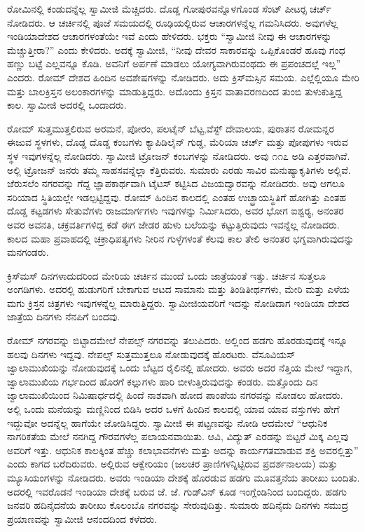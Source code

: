 \vskip 3pt

 ರೋಮಿನಲ್ಲಿ ಕಂಡುದನ್ನೆಲ್ಲ ಸ್ವಾಮೀಜಿ ಮೆಚ್ಚಿದರು. ದೊಡ್ಡ ಗೋಪುರವನ್ನೊಳಗೊಂಡ ಸೆಂಟ್ ಪೀಟರ‍್ಸ ಚರ್ಚ್ ನೋಡಿದರು. ಆ ಚರ್ಚಿನಲ್ಲಿ ಪೂಜೆ ಸಮಯದಲ್ಲಿ ರೂಢಿಯಲ್ಲಿರುವ ಆಚಾರಗಳನ್ನೆಲ್ಲ ಗಮನಿಸಿದರು. ಅವುಗಳೆಲ್ಲ ಇಂಡಿಯಾದೇಶದ ಆಚಾರಗಳಂತೆಯೇ ಇವೆ ಎಂದು ಹೇಳಿದರು. ಭಕ್ತರು “ಸ್ವಾಮೀಜಿ ನೀವು ಈ ಆಚಾರಗಳನ್ನು ಮೆಚ್ಚುತ್ತೀರಾ?” ಎಂದು ಕೇಳಿದರು. ಅದಕ್ಕೆ ಸ್ವಾಮೀಜಿ, “ನೀವು ದೇವರ ಸಾಕಾರವನ್ನು ಒಪ್ಪಿಕೊಂಡರೆ ಹೂವು ಗಂಧ ಹಣ್ಣು ಬಟ್ಟೆ ಎಲ್ಲವನ್ನೂ ಕೊಡಿ. ಅವನಿಗೆ ಅರ್ಪಣೆ ಮಾಡಲು ಯೋಗ್ಯವಾಗಿರುವಂಥದು ಈ ಪ್ರಪಂಚದಲ್ಲೆ ಇಲ್ಲ” ಎಂದರು. ರೋಮ್ ದೇಶದ ಹಿಂದಿನ ಅವಶೇಷಗಳನ್ನು ನೋಡಿದರು. ಅದು ಕ್ರಿಸ್‍ಮಸ್ಸಿನ ಸಮಯ. ಎಲ್ಲೆಲ್ಲಿಯೂ ಮೇರಿ ಮತ್ತು ಬಾಲಕ್ರಿಸ್ತನ ಅಲಂಕಾರಗಳನ್ನು ಮಾಡುತ್ತಿದ್ದರು. ಅದೊಂದು ಕ್ರಿಸ್ತನ ವಾತಾವರಣದಿಂದ ತುಂಬಿ ತುಳುಕುತ್ತಿದ್ದ ಕಾಲ. ಸ್ವಾಮೀಜಿ ಅದರಲ್ಲಿ ಒಂದಾದರು. 

 ರೋಮ್ ಸುತ್ತಮುತ್ತಲಿರುವ ಅರಮನೆ, ಪೋರಂ, ಪಲಟೈನ್ ಬೆಟ್ಟ,\break ವೆಸ್ಟ್ ದೇವಾಲಯ, ಪುರಾತನ ರೋಮನ್ನರ ಈಜುವ ಸ್ಥಳಗಳು, ದೊಡ್ಡ ದೊಡ್ಡ ಕಂಬಗಳು ಕ್ಯಾಪಿಡಿಲೈನ್ ಗುಡ್ಡ, ಮೆರಿಯಾ ಚರ್ಚ್ ಮತ್ತು ಪೋಪುಗಳು ಇರುವ ಸ್ಥಳ ಇವುಗಳನ್ನೆಲ್ಲ ನೋಡಿದರು. ಸ್ವಾಮೀಜಿ ಟ್ರೋಜನ್ ಕಂಬಗಳನ್ನು ನೋಡಿದರು. ಅವು ೧೧೭ ಅಡಿ ಎತ್ತರವಾಗಿವೆ. ಅಲ್ಲಿ ಟ್ರೋಜನ್ ಜನರು ತಮ್ಮ ಸಾಹಸವನ್ನೆಲ್ಲಾ ಕೆತ್ತಿರುವರು. ಸುಮಾರು ಎರಡು ಸಾವಿರ ಮನುಷ್ಯಾಕೃತಿಗಳು ಅಲ್ಲಿವೆ. ಜೆರುಸಲೆಂ ನಗರವನ್ನು ಗೆದ್ದ ಜ್ಞಾಪಕಾರ್ಥವಾಗಿ ಟೈಟಸ್ ಕಟ್ಟಿಸಿದ ವಿಜಯದ್ವಾರವನ್ನು ನೋಡಿದರು. ಅವು ಆಗಲೂ ಸರಿಯಾದ ಸ್ಥಿತಿಯಲ್ಲೇ ಇಡಲ್ಪಟ್ಟಿದ್ದವು. ರೋಮ್ ಹಿಂದಿನ ಕಾಲದಲ್ಲಿ ಎಂತಹ ಉಚ್ಛ್ರಾಯಸ್ಥಿತಿಗೆ ಹೋಗಿತ್ತು ಎಂತಹ ದೊಡ್ಡ ಕಟ್ಟಡಗಳು ಸೇತುವೆಗಳು ರಾಜಮಾರ್ಗಗಳು ಇವುಗಳನ್ನು ನಿರ್ಮಿಸಿದರು, ಅವರ ಭೋಗ ಐಶ್ವರ‍್ಯ, ಅನಂತರ ಅವರ ಅವನತಿ, ಚಕ್ರವರ್ತಿಗಳಿದ್ದ ಕಡೆ ಈಗ ಜೇಡರ ಹುಳು ಬಲೆಯನ್ನು ಕಟ್ಟುತ್ತಿರುವುದು ಇವನ್ನೆಲ್ಲ ನೋಡಿದರು. ಕಾಲದ ಮಹಾ ಪ್ರವಾಹದಲ್ಲಿ ಚಕ್ರಾಧಿಪತ್ಯಗಳು ನೀರಿನ ಗುಳ್ಳೆಗಳಂತೆ ಕೆಲವು ಕಾಲ ತೇಲಿ ಅನಂತರ ಭಗ್ನವಾಗಿರುವುದನ್ನು ಮನಗಂಡರು. 

\vskip 3pt

 ಕ್ರಿಸ್‍ಮಸ್ ದಿನಗಳಾದುದರಿಂದ ಮೇರಿಯ ಚರ್ಚಿನ ಮುಂದೆ ಒಂದು ಜಾತ್ರೆಯಂತೆ ಇತ್ತು. ಚರ್ಚಿನ ಸುತ್ತಲೂ ಅಂಗಡಿಗಳು. ಅದರಲ್ಲಿ ಹುಡುಗರಿಗೆ ಬೇಕಾಗುವ ಆಟದ ಸಾಮಾನು ಮತ್ತು ತಿಂಡಿತೀರ್ಥಗಳು, ಮೇರಿ ಮತ್ತು ಎಳೆಯ ಮಗು ಕ್ರಿಸ್ತನ ಚಿತ್ರಗಳು ಇವುಗಳನ್ನೆಲ್ಲ ಮಾರುತ್ತಿದ್ದರು. ಸ್ವಾಮೀಜಿಯವರಿಗೆ ಇದನ್ನು ನೋಡಿದಾಗ ಇಂಡಿಯಾ ದೇಶದ ಜಾತ್ರೆಯ ದಿನಗಳು ನೆನಪಿಗೆ ಬಂದವು. 

\newpage

 ರೋಮ್ ನಗರವನ್ನು ಬಿಟ್ಟಾದಮೇಲೆ ನೇಪಲ್ಸ್ ನಗರವನ್ನು ತಲುಪಿದರು. ಅಲ್ಲಿಂದ ಹಡಗು ಹೊರಡುವುದಕ್ಕೆ ಇನ್ನೂ ಹಲವು ದಿನಗಳು ಇದ್ದವು. ನೇಪಲ್ಸ್ ಸುತ್ತಮುತ್ತಲೂ ನೋಡುವುದಕ್ಕೆ ಹೊರಟರು. ವೆಸೂವಿಯಸ್ ಜ್ವಾಲಾಮುಖಿಯನ್ನು ನೋಡುವುದಕ್ಕೆ ಒಂದು ಬೆಟ್ಟದ ರೈಲಿನಲ್ಲಿ ಹೋದರು. ಅವರು ಅದರ ನೆತ್ತಿಯ ಮೇಲೆ ಇದ್ದಾಗ, ಜ್ವಾಲಾಮುಖಿಯ ಗರ್ಭದಿಂದ ಹೊರಗೆ ಕಲ್ಲುಗಳು ಹಾರಿ ಬೀಳುತ್ತಿರುವುದನ್ನು ಕಂಡರು. ಮತ್ತೊಂದು ದಿನ ಜ್ವಾಲಾಮುಖಿಯಿಂದ ನಿಮಿಷಾರ್ಧದಲ್ಲಿ ಹಿಂದೆ ನಾಶವಾಗಿ ಹೋದ ಪಾಂಪೆಯ ನಗರವನ್ನು ನೋಡಲು ಹೋದರು. ಅಲ್ಲಿ ಒಂದು ಮನೆಯನ್ನು ಮಣ್ಣಿನಿಂದ ಬಿಡಿಸಿ ಅದರ ಒಳಗೆ ಹಿಂದಿನ ಕಾಲದಲ್ಲಿ ಯಾವ ಯಾವ ವಸ್ತುಗಳು ಹೇಗೆ ಇದ್ದುವೋ ಅದನ್ನೆಲ್ಲ ಹಾಗೆಯೇ ಜೋಡಿಸಿದ್ದರು. ಸ್ವಾಮೀಜಿ ಈ ಪಟ್ಟಣವನ್ನು ನೋಡಿ ಆದಮೇಲೆ “ಆಧುನಿಕ ನಾಗರಿಕತೆಯ ಮೇಲೆ ನನಗಿದ್ದ ಗೌರವಗಳೆಲ್ಲ ಪಲಾಯನವಾಯಿತು. ಆವಿ, ವಿದ್ಯುತ್ ಎರಡನ್ನು ಬಿಟ್ಟರೆ ಮಿಕ್ಕ ಎಲ್ಲವು ಅವರಿಗೆ ಇತ್ತು. ಆಧುನಿಕ ಕಾಲಕ್ಕಿಂತ ಹೆಚ್ಚು ಕಲಾಭಾವನೆಗಳು ಮತ್ತು ಅದನ್ನು ಕಾರ್ಯಗತಮಾಡುವ ಶಕ್ತಿ ಅವರಲ್ಲಿತ್ತು” ಎಂದು ಕಾಗದ ಬರೆದಿರುವರು. ಅಲ್ಲಿರುವ ಆಕ್ವೇರಿಯಂ (ಜಲಚರ ಪ್ರಾಣಿಗಳನ್ನಿಟ್ಟಿರುವ ಪ್ರದರ್ಶನಾಲಯ) ಮತ್ತು ಮ್ಯೂಸಿಯಂಗಳನ್ನು ನೋಡಿದರು. ಅವರು ಇಂಡಿಯಾ ದೇಶಕ್ಕೆ ಹೊರಡುವ ಹಡಗು ಮೂವತ್ತನೆಯ ತಾರೀಖು ಬಂದಿತು. ಅದರಲ್ಲಿ ಇವರೊಡನೆ ಇಂಡಿಯಾ ದೇಶಕ್ಕೆ ಬರುವ ಜೆ. ಜೆ. ಗುಡ್‍ವಿನ್ ಕೂಡ ಇಂಗ್ಲೆಂಡಿನಿಂದ ಬಂದಿದ್ದರು. ಹಡಗು ಜನವರಿ ಹದಿನೈದನೆಯ ತಾರೀಖು ಕೊಲಂಬೊ ನಗರವನ್ನು ಸೇರುವುದಿತ್ತು. ಸುಮಾರು ಹದಿನೈದು ದಿನಗಳು ಸಮುದ್ರ ಪ್ರಯಾಣವನ್ನು ಸ್ವಾಮೀಜಿ ಆನಂದದಿಂದ ಕಳೆದರು. 

